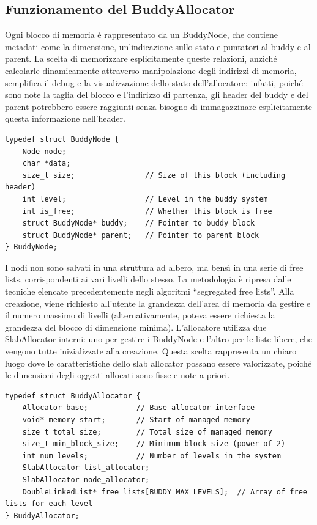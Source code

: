 \subsection*{Funzionamento del BuddyAllocator}
Ogni blocco di memoria è rappresentato da un BuddyNode, che contiene metadati come la dimensione, un’indicazione sullo stato e puntatori al buddy e al parent. La scelta di memorizzare esplicitamente queste relazioni, anziché calcolarle dinamicamente attraverso manipolazione degli indirizzi di memoria, semplifica il debug e la visualizzazione dello stato dell'allocatore: infatti, poiché sono note la taglia del blocco e l’indirizzo di partenza, gli header del buddy e del parent potrebbero essere raggiunti senza bisogno di immagazzinare esplicitamente questa informazione nell’header.

\begin{lstlisting}
typedef struct BuddyNode {
    Node node;
    char *data;
    size_t size;                // Size of this block (including header)
    int level;                  // Level in the buddy system
    int is_free;                // Whether this block is free
    struct BuddyNode* buddy;    // Pointer to buddy block
    struct BuddyNode* parent;   // Pointer to parent block
} BuddyNode;
\end{lstlisting}

I nodi non sono salvati in una struttura ad albero, ma bensì in una serie di free lists, corrispondenti ai vari livelli dello stesso. La metodologia è ripresa dalle tecniche elencate precedentemente negli algoritmi “segregated free lists”. Alla creazione, viene richiesto all’utente la grandezza dell’area di memoria da gestire e il numero massimo di livelli (alternativamente, poteva essere richiesta la grandezza del blocco di dimensione minima). L'allocatore utilizza due SlabAllocator interni: uno per gestire i BuddyNode e l'altro per le liste libere, che vengono tutte inizializzate alla creazione. Questa scelta rappresenta un chiaro luogo dove le caratteristiche dello slab allocator possano essere valorizzate, poiché le dimensioni degli oggetti allocati sono fisse e note a priori.

\begin{lstlisting}
typedef struct BuddyAllocator {
    Allocator base;           // Base allocator interface
    void* memory_start;       // Start of managed memory
    size_t total_size;        // Total size of managed memory
    size_t min_block_size;    // Minimum block size (power of 2)
    int num_levels;           // Number of levels in the system
    SlabAllocator list_allocator;
    SlabAllocator node_allocator;
    DoubleLinkedList* free_lists[BUDDY_MAX_LEVELS];  // Array of free lists for each level
} BuddyAllocator;
\end{lstlisting}

